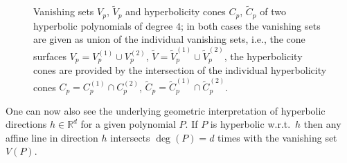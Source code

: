 \begin{figure}
\begin{minipage}{0.45\textwidth}
\begin{center}
\end{center}
\end{minipage}
    \caption[Hyperbolic Polynomials of Degree $4$.]{Vanishing sets $V_p$, $\widetilde{V}_p$ and hyperbolicity cones $C_p$, $\widetilde{C}_p$ of two hyperbolic polynomials of degree $4$; in both cases the vanishing sets are given as union of the individual vanishing sets, i.e., the cone surfaces $V_p = V_p^{(1)} \cup V_p^{(2)}$, $\widetilde{V} = \widetilde{V}_p^{(1)} \cup \widetilde{V}_p^{(2)}$, the hyperbolicity cones are provided by the intersection of the individual hyperbolicity cones $C_p = C_p^{(1)} \cap C_p^{(2)}$,  $\widetilde{C}_p = \widetilde{C}_p^{(1)} \cap \widetilde{C}_p^{(2)}$.}
    \label{Poly}
\end{figure}
One can now also see the underlying geometric interpretation of  hyperbolic directions  $h\in \mathbb{R}^d$ for a given polynomial $P$. If $P$ is hyperbolic w.r.t.\ $h$ then any affine line in direction $h$ intersects $\operatorname{deg}(P) = d$ times with the vanishing set $V(P)$.

